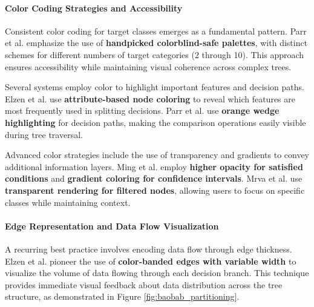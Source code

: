 
\paragraph{Color Coding Strategies and Accessibility}

Consistent color coding for target classes emerges as a fundamental pattern. Parr et al. \cite{parr2019dtreeviz} emphasize the use of \textbf{handpicked colorblind-safe palettes}, with distinct schemes for different numbers of target categories (2 through 10). This approach ensures accessibility while maintaining visual coherence across complex trees.

Several systems employ color to highlight important features and decision paths. Elzen et al. \cite{elzen2011baobabview} use \textbf{attribute-based node coloring} to reveal which features are most frequently used in splitting decisions. Parr et al. \cite{parr2019dtreeviz} use \textbf{orange wedge highlighting} for decision paths, making the comparison operations easily visible during tree traversal.

Advanced color strategies include the use of transparency and gradients to convey additional information layers. Ming et al. \cite{ming2019rulematrix} employ \textbf{higher opacity for satisfied conditions} and \textbf{gradient coloring for confidence intervals}. Mrva et al. \cite{mrva2019decision} use \textbf{transparent rendering for filtered nodes}, allowing users to focus on specific classes while maintaining context.

\paragraph{Edge Representation and Data Flow Visualization}

A recurring best practice involves encoding data flow through edge thickness. Elzen et al. \cite{elzen2011baobabview} pioneer the use of \textbf{color-banded edges with variable width} to visualize the volume of data flowing through each decision branch. This technique provides immediate visual feedback about data distribution across the tree structure, as demonstrated in Figure \ref{fig:baobab_partitioning}.

